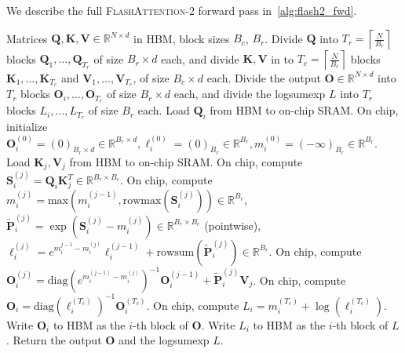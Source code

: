We describe the full \textsc{FlashAttention-2} forward pass in~\ref{alg:flash2_fwd}.

\begin{algorithm}[H]

  \caption{\small\label{alg:flash2_fwd}\textsc{FlashAttention-2} forward pass}
  \begin{algorithmic}[1]
    \REQUIRE Matrices $\mathbf{Q}, \mathbf{K}, \mathbf{V} \in \mathbb{R}^{N \times d}$ in HBM, block sizes $B_c$, $B_r$.
    \STATE \label{alg:stream_attn_split_qkv} Divide $\mathbf{Q}$ into $T_r = \left\lceil\frac{N}{B_r} \right\rceil$ blocks $\mathbf{Q}_1, \dots, \mathbf{Q}_{T_r}$ of size $B_r \times d$ each, and divide $\mathbf{K}, \mathbf{V}$ in to $T_c = \left\lceil \frac{N}{B_c} \right\rceil$ blocks $\mathbf{K}_1, \dots, \mathbf{K}_{T_c}$ and
    $\mathbf{V}_1, \dots, \mathbf{V}_{T_c}$, of size $B_c \times d$ each.
    \STATE Divide the output $\mathbf{O} \in \mathbb{R}^{N \times d}$ into $T_r$ blocks $\mathbf{O}_i, \dots, \mathbf{O}_{T_r}$ of size $B_r \times d$ each, and divide the logsumexp $L$ into $T_r$ blocks $L_i, \dots, L_{T_r}$ of size $B_r$ each.
     \label{alg:stream_attn_outer_loop}
      \STATE \label{alg:stream_attn_load_q} Load $\mathbf{Q}_i$ from HBM to on-chip SRAM.
      \STATE \label{alg:stream_attn_init} On chip, initialize $\mathbf{O}_{i}^{(0)} = (0)_{B_r \times d} \in \mathbb{R}^{B_r \times d}, \ell_{i}^{(0)} = (0)_{B_r} \in \mathbb{R}^{B_r}, m_{i}^{(0)} = (-\infty)_{B_r} \in \mathbb{R}^{B_r}$.
        \STATE \label{alg:stream_attn_load_kv} Load $\mathbf{K}_j, \mathbf{V}_j$ from HBM to on-chip SRAM.
        \STATE \label{alg:stream_attn_qk} On chip, compute $\mathbf{S}_{i}^{(j)} = \mathbf{Q}_i \mathbf{K}_j^T \in \mathbb{R}^{B_r \times B_c}$.
        \STATE \label{alg:stream_attn_statistics} On chip, compute $m_{i}^{(j)} = \mathrm{max}(m_{i}^{(j-1)}, \mathrm{rowmax}(\mathbf{S}_{i}^{(j)})) \in \mathbb{R}^{B_r}$, $\tilde{\mathbf{P}}_{i}^{(j)} = \exp(\mathbf{S}_{i}^{(j)} - m_{i}^{(j)}) \in \mathbb{R}^{B_r \times B_c}$ (pointwise),
        $\ell_{i}^{(j)} = e^{m_{i}^{j-1} - m_{i}^{(j)}} \ell_{i}^{(j-1)} + \mathrm{row sum}(\tilde{\mathbf{P}}_{i}^{(j)}) \in \mathbb{R}^{B_r}$.
        \STATE \label{alg:stream_attn_update} On chip, compute
        $\mathbf{O}_{i}^{(j)} = \mathrm{diag}(e^{m_{i}^{(j-1)} - m_{i}^{(j)}})^{-1} \mathbf{O}_{i}^{(j-1)} + \tilde{\mathbf{P}}_{i}^{(j)} \mathbf{V}_j$.
      \ENDFOR
      \STATE On chip, compute $\mathbf{O}_{i} = \mathrm{diag}(\ell_{i}^{(T_c)})^{-1} \mathbf{O}_{i}^{(T_c)}$.
      \STATE On chip, compute $L_{i} = m_{i}^{(T_c)} + \log(\ell_i^{(T_c)})$.
      \STATE Write $\mathbf{O}_{i}$ to HBM as the $i$-th block of $\mathbf{O}$.
      \STATE Write $L_{i}$ to HBM as the $i$-th block of $L$.
    \ENDFOR
    \STATE Return the output $\mathbf{O}$ and the logsumexp $L$.
  \end{algorithmic}
\end{algorithm}

